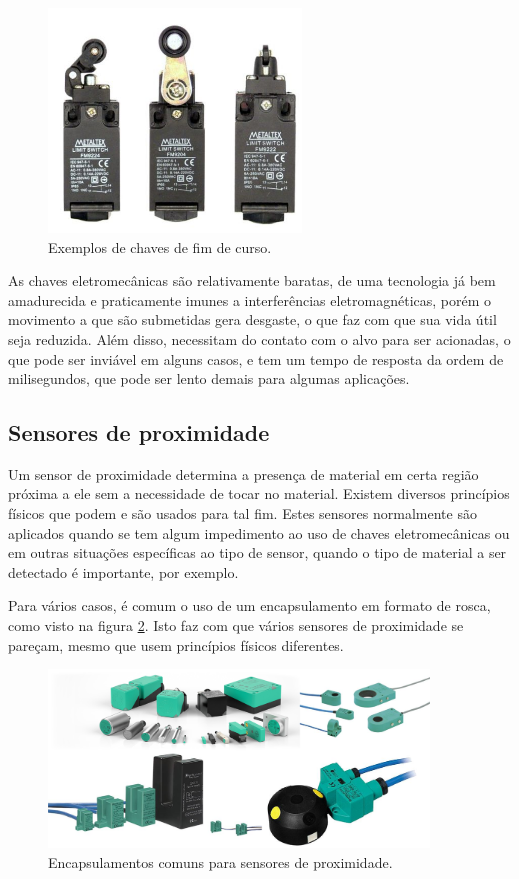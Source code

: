 \begin{figure}
  \centering
  \includegraphics[width=0.6\textwidth]{figuras/fim-de-curso}
  \caption{Exemplos de chaves de fim de curso.}\label{fig:fim-de-curso}
\end{figure}

As chaves eletromecânicas são relativamente baratas, de uma tecnologia já bem amadurecida e praticamente imunes a interferências eletromagnéticas, porém o movimento a que são submetidas gera desgaste, o que faz com que sua vida útil seja reduzida. Além disso, necessitam do contato com o alvo para ser acionadas, o que pode ser inviável em alguns casos, e tem um tempo de resposta da ordem de milisegundos, que pode ser lento demais para algumas aplicações.

\subsection{Sensores de proximidade}

Um sensor de proximidade determina a presença de material em certa região próxima a ele sem a necessidade de tocar no material. Existem diversos princípios físicos que podem e são usados para tal fim. Estes sensores normalmente são aplicados quando se tem algum impedimento ao uso de chaves eletromecânicas ou em outras situações específicas ao tipo de sensor, quando o tipo de material a ser detectado é importante, por exemplo.

Para vários casos, é comum o uso de um encapsulamento em formato de rosca, como visto na figura \ref{fig:proximidade}. Isto faz com que vários sensores de proximidade se pareçam, mesmo que usem princípios físicos diferentes.

\begin{figure}
  \centering
  \includegraphics[width=0.9\textwidth]{figuras/Sensores-de-Proximidade_2}
  \caption{Encapsulamentos comuns para sensores de proximidade.}\label{fig:proximidade}
\end{figure}

